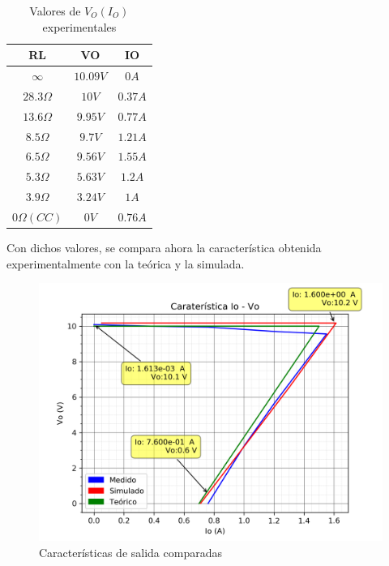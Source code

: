 \begin{table}[!ht]
\begin{centering}

\begin{tabular}[H]{|c|c|c|}
\hline 
RL & VO & IO\tabularnewline
\hline 
\hline 
$\infty$ & $10.09V$ & $0A$\tabularnewline
\hline 
$28.3 \Omega$ & $10V$ & $0.37A$\tabularnewline
\hline 
$13.6 \Omega$ & $9.95V$ & $0.77A$\tabularnewline
\hline 
$8.5 \Omega$ & $9.7V$ & $1.21A$\tabularnewline
\hline 
$6.5 \Omega$ & $9.56V$ & $1.55A$\tabularnewline
\hline 
$5.3 \Omega$ & $5.63V$ & $1.2A$\tabularnewline
\hline 
$3.9 \Omega$ & $3.24V$ & $1A$\tabularnewline
\hline 
$0 \Omega (CC)$ & $0V$ & $0.76A$\tabularnewline
\hline 
\end{tabular}
\par\end{centering}
\caption{Valores de $V_O(I_O)$ experimentales}

\end{table}

Con dichos valores, se compara ahora la caracter\'istica obtenida experimentalmente con la te\'orica y la simulada.

\begin{figure}[!ht]
\begin{centering}
\includegraphics[scale=0.7]{Imagenes/Caracteristica_iovo.png}
\par\end{centering}
\caption{Caracter\'isticas de salida comparadas}

\end{figure}  

